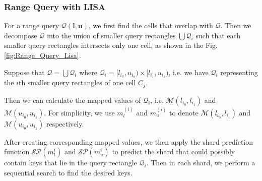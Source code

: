 \subsubsection{Range Query with LISA}


For a range query $\mathcal{Q}(\boldsymbol{l},\boldsymbol{u})$, we first find the cells that overlap with $\mathcal{Q}$. Then we decompose $\mathcal{Q}$ into the union of smaller query rectangles $\bigcup \mathcal{Q}_i$ such that each smaller query rectangles intersects only one cell, as shown in the Fig. \ref{fig:Range_Query_Lisa}.



 Suppose that $\mathcal{Q}=\bigcup \mathcal{Q}_i$ where $\mathcal{Q}_i=[l_{i_0}, u_{i_o})\times [l_{i_1}, u_{i_1})$, i.e. we have $\mathcal{Q}_i$ representing the $i$th smaller query rectangles of one cell $C_j$.
 
 Then we can calculate the mapped values of $\mathcal{Q}_i$, i.e. $\mathcal{M}(l_{i_0}, l_{i_1})$ and $\mathcal{M}(u_{i_0}, u_{i_1})$. For simplicity, we use $m_l^{(i)}$ and $m_u^{(i)}$ to denote $\mathcal{M}(l_{i_0}, l_{i_1})$ and $\mathcal{M}(u_{i_0}, u_{i_1})$ respectively.
 
After creating corresponding mapped values, we then apply the shard prediction function $\mathcal{SP}(m_{l}^{i})$ and $\mathcal{SP}(m_{u}^{i})$ to predict the shard that could possibly contain keys that lie in the query rectangle $\mathcal{Q}_i$. Then in each shard, we perform a sequential search to find the desired keys. 

